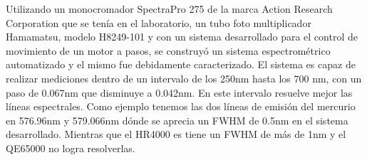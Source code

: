 Utilizando un monocromador SpectraPro 275 de la marca Action Research Corporation que se tenía en el laboratorio, un tubo foto multiplicador Hamamatsu, modelo H8249-101 y con un sistema desarrollado para el control de movimiento de un motor a pasos, se construyó un sistema espectrométrico automatizado y el mismo fue debidamente caracterizado.
El sistema es capaz de realizar mediciones dentro de un intervalo de los 250nm hasta los 700 nm, con un paso de 0.067nm que disminuye a 0.042nm. En este intervalo resuelve mejor las líneas espectrales. Como ejemplo tenemos las dos líneas de emisión del mercurio en 576.96nm y 579.066nm dónde se aprecia un FWHM de 0.5nm en el sistema desarrollado. Mientras que el HR4000 es tiene un FWHM de más de 1nm y el QE65000 no logra resolverlas. \\

%
%


